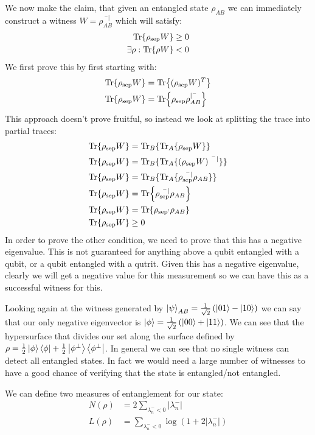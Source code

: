 We now make the claim, that given an entangled state $\rho_{AB}$ we can immediately construct a witness $W = \rho_{AB}^{\ ^-|}$ which will satisfy:
\begin{align*}
	\Tr{\rho_\text{sep}W} &\geq 0 \\
	\exists \rho: \Tr{\rho W} &< 0
\end{align*}
We first prove this by first starting with:
\begin{align*}
	\Tr{\rho_\text{sep} W} &= \Tr{(\rho_\text{sep} W)^T} \\
	\Tr{\rho_\text{sep} W} &= \Tr{\rho_\text{sep} \rho_{AB}^{|^-}}
\end{align*}
This approach doesn't prove fruitful, so instead we look at splitting the trace into partial traces:
\begin{align*}
	\Tr{\rho_\text{sep} W} &= \Tr_B\{\Tr_A\{\rho_\text{sep} W\}\} \\
	\Tr{\rho_\text{sep} W} &= \Tr_B\{\Tr_A\{(\rho_\text{sep} W)^{\ ^-|}\}\} \\
	\Tr{\rho_\text{sep} W} &= \Tr_B\{\Tr_A\{\rho_\text{sep}^{\ ^-|} \rho_{AB}\}\} \\
	\Tr{\rho_\text{sep} W} &= \Tr{\rho_\text{sep}^{\ ^-|} \rho_{AB}} \\
	\Tr{\rho_\text{sep} W} &= \Tr{\rho_\text{sep'} \rho_{AB}} \\
	\Tr{\rho_\text{sep} W} &\geq 0
\end{align*}
In order to prove the other condition, we need to prove that this has a negative eigenvalue. This is not guaranteed for anything above a qubit entangled with a qubit, or a qubit entangled with a qutrit.
Given this has a negative eigenvalue, clearly we will get a negative value for this measurement so we can have this as a successful witness for this.

Looking again at the witness generated by $\ket{\psi}_{AB} =  \frac{1}{\sqrt{2}}\left(\ket{01} - \ket{10}\right)$ we can say that our only negative eigenvector is $\ket{\phi} = \frac{1}{\sqrt{2}}\left(\ket{00} + \ket{11}\right)$.
We can see that the hypersurface that divides our set along the surface defined by $\rho = \frac{1}{2} \ket{\phi}\bra{\phi} + \frac{1}{2} \ket{\phi^\perp}\bra{\phi^\perp}$. In general we can see that no single witness can detect all entangled states.
In fact we would need a large number of witnesses to have a good chance of verifying that the state is entangled/not entangled.

We can define two measures of entanglement for our state:
\begin{align*}
	N(\rho) &= 2\sum_{\lambda_n^- <0} |\lambda_n^- | \\
	L(\rho) &= \sum_{\lambda_n^- <0 } \log(1 + 2|\lambda_n^-|)
\end{align*}
